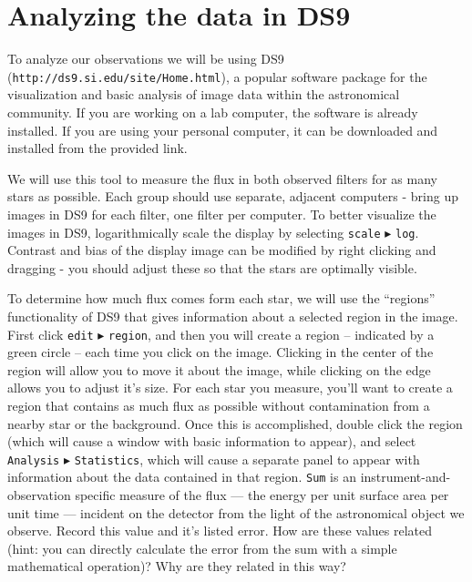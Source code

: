 \section{Analyzing the data in DS9}

To analyze our observations we will be using DS9 (\texttt{http://ds9.si.edu/site/Home.html}), a popular software package for the visualization and basic analysis of image data within the astronomical community. If you are working on a lab computer, the software is already installed. If you are using your personal computer, it can be downloaded and installed from the provided link. 

We will use this tool to measure the flux in both observed filters for as many stars as possible. Each group should use separate, adjacent computers - bring up images in DS9 for each filter, one filter per computer. To better visualize the images in DS9, logarithmically scale the display by selecting \texttt{scale} $\blacktriangleright$ \texttt{log}. Contrast and bias of the display image can be modified by right clicking and dragging - you should adjust these so that the stars are optimally visible.

To determine how much flux comes form each star, we will use the ``regions'' functionality of DS9 that gives information about a selected region in the image. First click \texttt{edit} $\blacktriangleright$ \texttt{region}, and then you will create a region -- indicated by a green circle -- each time you click on the image. Clicking in the center of the region will allow you to move it about the image, while clicking on the edge allows you to adjust it's size. For each star you measure, you'll want to create a region that contains as much flux as possible without contamination from a nearby star or the background. Once this is accomplished, double click the region (which will cause a window with basic information to appear), and select \texttt{Analysis} $\blacktriangleright$ \texttt{Statistics}, which will cause a separate panel to appear with information about the data contained in that region. \texttt{Sum} is an instrument-and-observation specific measure of the flux --- the energy per unit surface area per unit time --- incident on the detector from the light of the astronomical object we observe. Record this value and it's listed error. How are these values related (hint: you can directly calculate the error from the sum with a simple mathematical operation)? Why are they related in this way?

